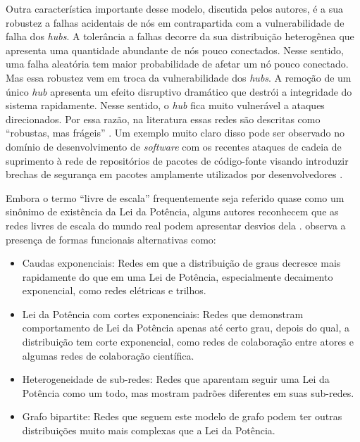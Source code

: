 \documentclass[12pt,oneside,a4paper,brazil,sumario=tradicional]{abntex2}
\begin{document}
Outra característica importante desse modelo, discutida pelos autores, é a sua robustez a falhas acidentais de nós em contrapartida com a vulnerabilidade de falha dos \textit{hubs}. A tolerância a falhas decorre da sua distribuição heterogênea que apresenta uma quantidade abundante de nós pouco conectados. Nesse sentido, uma falha aleatória tem maior probabilidade de afetar um nó pouco conectado. Mas essa robustez vem em troca da vulnerabilidade dos \textit{hubs}. A remoção de um único \textit{hub} apresenta um efeito disruptivo dramático que destrói a integridade do sistema rapidamente. Nesse sentido, o \textit{hub }fica muito vulnerável a ataques direcionados. Por essa razão, na literatura essas redes são descritas como “robustas, mas frágeis” \parencite{wang2003, newman2003, serafino2021}. Um exemplo muito claro disso pode ser observado no domínio de desenvolvimento de \textit{software }com os recentes ataques de cadeia de suprimento \parencite{thompson1984} à rede de repositórios de pacotes de código-fonte visando introduzir brechas de segurança em pacotes amplamente utilizados por desenvolvedores \parencite{saayman2026, dholakia2026}.

Embora o termo “livre de escala” frequentemente seja referido quase como um sinônimo de existência da Lei da Potência, alguns autores reconhecem que as redes livres de escala do mundo real podem apresentar desvios dela \parencite{smith2020, meng2023, crane2015}. \textcite{newman2003} observa a presença de formas funcionais alternativas como:

\begin{itemize}
  \item Caudas exponenciais: Redes em que a distribuição de graus decresce mais rapidamente do que em uma Lei de Potência, especialmente decaimento exponencial, como redes elétricas e trilhos.
  \item Lei da Potência com cortes exponenciais: Redes que demonstram comportamento de Lei da Potência apenas até certo grau, depois do qual, a distribuição tem corte exponencial, como redes de colaboração entre atores e algumas redes de colaboração científica.
  \item Heterogeneidade de sub-redes: Redes que aparentam seguir uma Lei da Potência como um todo, mas mostram padrões diferentes em suas sub-redes.
  \item Grafo bipartite: Redes que seguem este modelo de grafo podem ter outras distribuições muito mais complexas que a Lei da Potência.
\end{itemize}
\end{document}
